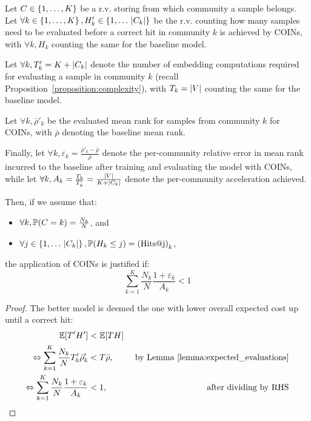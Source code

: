 \begin{proposition}
    \label{proposition:condition_applicability}
    Let $C \in \mathopen{}\left\{1,\dots,K\right\}$ be a r.v. storing from which community a sample belongs. Let $\forall k \in \mathopen{}\left\{1,\dots,K\right\}, H'_k \in \mathopen{}\left\{1,\dots\,\mathopen{}\left|C_k\right|\right\}$ be the r.v. counting how many samples need to be evaluated before a correct hit in community $k$ is achieved by COINs, with $\forall k, H_k$ counting the same for the baseline model. 
    
    Let $\forall k, T'_k=K+\mathopen{}\left|C_k\right|$ denote the number of embedding computations required for evaluating a sample in community $k$ (recall Proposition~\ref{proposition:complexity}), with $T_k=\mathopen{}\left|V\right|$ counting the same for the baseline model. 
    
    Let $\forall k, \bar{\rho}'_k$ be the evaluated mean rank for samples from community $k$ for COINs, with $\bar{\rho}$ denoting the baseline mean rank. 
    
    Finally, let $\forall k, \varepsilon_k = \frac{\bar{\rho}'_k - \bar{\rho}}{\bar{\rho}}$ denote the per-community relative error in mean rank incurred to the baseline after training and evaluating the model with COINs, while let $\forall k, A_k=\frac{T_k}{T'_k}=\frac{\mathopen{}\left|V\right|}{K+\mathopen{}\left|C_k\right|}$ denote the per-community acceleration achieved. 
    
    Then, if we assume that:
    \begin{itemize}
        \item $\forall k, \mathbb{P}\mathopen{}\left(C=k\right)=\frac{N_k}{N}$, and
        \item $\forall j \in \mathopen{}\left\{1,\dots\,\mathopen{}\left|C_k\right|\right\}, \mathbb{P}\mathopen{}\left(H_k \leq j\right)=\mathopen{}\left(\text{Hits@j}\right)_k$,
    \end{itemize}
     the application of COINs is justified if:
    \begin{equation}
        \label{eq:condition_applicability}
        \sum_{k=1}^{K}{\frac{N_k}{N} \frac{1 + \varepsilon_k}{A_k}} < 1
    \end{equation}
\end{proposition}
\begin{proof}
The better model is deemed the one with lower overall expected cost up until a correct hit:
    \begin{align*}
        \mathbb{E}\mathopen{}\left[T' H'\right] &< \mathbb{E}\mathopen{}\left[T H\right] \\
        \Leftrightarrow \sum_{k=1}^{K}{\frac{N_k}{N} T'_k \bar{\rho}'_k} &< T \bar{\rho}, & \text{ by Lemma~\ref{lemma:expected_evaluations}} \\
        \Leftrightarrow \sum_{k=1}^{K}{\frac{N_k}{N} \frac{1 + \varepsilon_k}{A_k}} &< 1, & \text{ after dividing by RHS}
    \end{align*}
\end{proof}%

